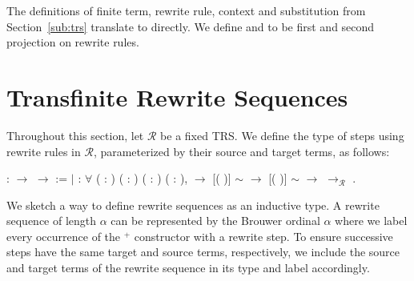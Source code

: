 The definitions of finite term, rewrite rule, context and substitution from
Section~\ref{sub:trs} translate to \Coq directly. We define
 and  to be first and second
projection on rewrite rules.


\section{Transfinite Rewrite Sequences}\label{sec:seq}

Throughout this section, let $\mathcal{R}$ be a fixed TRS. We define the type
of steps using rewrite rules in $\mathcal{R}$, parameterized by their source
and target terms, as follows:
\begin{singlespace}
\begin{coqdoccode}
\coqdocnoindent
{}  :
 \ensuremath{\rightarrow}
 \ensuremath{\rightarrow}
 :=\coqdoceol
\coqdocindent{1.00em}
\ensuremath{|}  :
\ensuremath{\forall} (  :
) (\coqdocvar{$\rho$} :
) ( :
) (\coqdocvar{$\sigma$} :
),\coqdoceol
\coqdocindent{6.50em} \coqdocvariable{$\rho$}
 \ensuremath{\rightarrow}\coqdoceol
\coqdocindent{6.50em}
[(
\coqdocvariable{$\rho$})\coqdocvariable{$^\sigma$}] $\sim$ 
\ensuremath{\rightarrow}\coqdoceol
\coqdocindent{6.50em}
[(
\coqdocvariable{$\rho$})\coqdocvariable{$^\sigma$}] $\sim$ 
\ensuremath{\rightarrow}\coqdoceol
\coqdocindent{6.50em}
 $\rightarrow_\mathcal{R}$ .\coqdoceol
\end{coqdoccode}
\end{singlespace}
We sketch a way to define rewrite sequences as an inductive type. A rewrite
sequence of length $\alpha$ can be represented by the Brouwer ordinal $\alpha$
where we label every occurrence of the $^+$ constructor with a rewrite
step. To ensure successive steps have the same target and source terms,
respectively, we include the source and target terms of the rewrite sequence
in its type and label accordingly.

